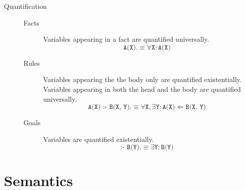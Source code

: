 \begin{description}
        \begin{description}
            \item[Quantification]  \phantom{}
                \begin{description}
                    \item[Facts] 
                        Variables appearing in a fact are quantified universally.
                        \[ \texttt{A(X).} \equiv \forall \texttt{X}: \texttt{A(X)}  \]
                    \item[Rules] 
                        Variables appearing the the body only are quantified existentially.
                        Variables appearing in both the head and the body are quantified universally.
                        \[ \texttt{A(X) :- B(X, Y).} \equiv \forall \texttt{X}, \exists \texttt{Y} : \texttt{A(X)} \Leftarrow \texttt{B(X, Y)} \]

                    \item[Goals] 
                        Variables are quantified existentially.
                        \[ \texttt{:- B(Y).} \equiv \exists \texttt{Y} : \texttt{B(Y)}  \]
                \end{description}
        \end{description}
\end{description}


\section{Semantics}

